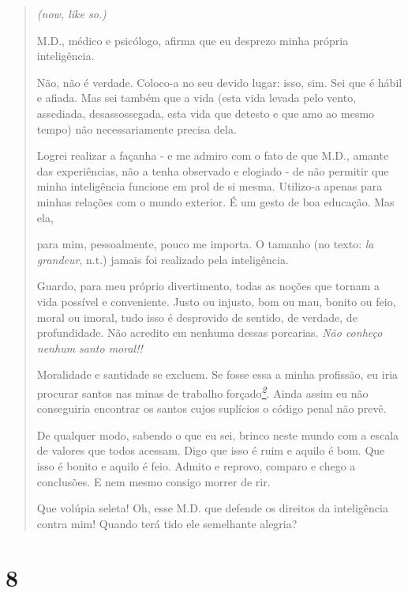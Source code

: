 \begin{quote}
\emph{(now, like so.)}

M.D., médico e psicólogo, afirma que eu desprezo minha própria
inteligência.

Não, não é verdade. Coloco-a no seu devido lugar: isso, sim. Sei que é
hábil e afiada. Mas sei também que a vida (esta vida levada pelo vento,
assediada, desassossegada, esta vida que detesto e que amo ao mesmo
tempo) não necessariamente precisa dela.

Logrei realizar a façanha - e me admiro com o fato de que M.D., amante
das experiências, não a tenha observado e elogiado - de não permitir que
minha inteligência funcione em prol de si mesma. Utilizo-a apenas para
minhas relações com o mundo exterior. É um gesto de boa educação. Mas
ela,

para mim, pessoalmente, pouco me importa. O tamanho (no texto: \emph{la
grandeur}, n.t.) jamais foi realizado pela inteligência.

Guardo, para meu próprio divertimento, todas as noções que tornam a vida
possível e conveniente. Justo ou injusto, bom ou mau, bonito ou feio,
moral ou imoral, tudo isso é desprovido de sentido, de verdade, de
profundidade. Não acredito em nenhuma dessas porcarias. \emph{Não
conheço nenhum santo moral!!}

Moralidade e santidade se excluem. Se fosse essa a minha profissão, eu
iria procurar santos nas minas de trabalho
forçado\protect\hyperlink{_bookmark1}{\textsuperscript{\emph{2}}}. Ainda
assim eu não conseguiria encontrar os santos cujos suplícios o código
penal não prevê.

De qualquer modo, sabendo o que eu sei, brinco neste mundo com a escala
de valores que todos acessam. Digo que isso é ruim e aquilo é bom. Que
isso é bonito e aquilo é feio. Admito e reprovo, comparo e chego a
conclusões. E nem mesmo consigo morrer de rir.

Que volúpia seleta! Oh, esse M.D. que defende os direitos da
inteligência contra mim! Quando terá tido ele semelhante alegria?
\end{quote}

\section{8}\label{section-7}

